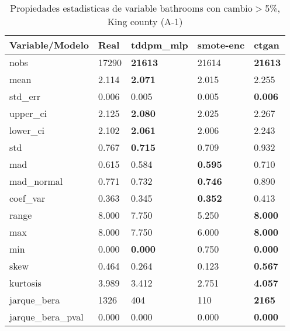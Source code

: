 \begin{table}[H]
\centering
\fontsize{8}{14}\selectfont
\caption{Propiedades estadisticas de variable bathrooms con cambio\ensuremath{>}5\%, King county (A-1)}
\label{table-stats-king county-a-1-bathrooms-short}
\begin{tabular}{|l|m{10em}|m{10em}|m{10em}|m{10em}|}
\hline
 \rowcolor[gray]{0.8}
Variable/Modelo & Real & tddpm\_mlp & smote-enc & ctgan \\
\hline nobs & 17290 & \bfseries 21613 & \cellcolor[rgb]{0.9, 0.54, 0.52} 21614 & \bfseries 21613 \\
\hline mean & 2.114 & \bfseries 2.071 & 2.015 & \cellcolor[rgb]{0.9, 0.54, 0.52} 2.255 \\
\hline std\_err & 0.006 & 0.005 & \cellcolor[rgb]{0.9, 0.54, 0.52} 0.005 & \bfseries 0.006 \\
\hline upper\_ci & 2.125 & \bfseries 2.080 & 2.025 & \cellcolor[rgb]{0.9, 0.54, 0.52} 2.267 \\
\hline lower\_ci & 2.102 & \bfseries 2.061 & 2.006 & \cellcolor[rgb]{0.9, 0.54, 0.52} 2.243 \\
\hline std & 0.767 & \bfseries 0.715 & 0.709 & \cellcolor[rgb]{0.9, 0.54, 0.52} 0.932 \\
\hline mad & 0.615 & 0.584 & \bfseries 0.595 & \cellcolor[rgb]{0.9, 0.54, 0.52} 0.710 \\
\hline mad\_normal & 0.771 & 0.732 & \bfseries 0.746 & \cellcolor[rgb]{0.9, 0.54, 0.52} 0.890 \\
\hline coef\_var & 0.363 & 0.345 & \bfseries 0.352 & \cellcolor[rgb]{0.9, 0.54, 0.52} 0.413 \\
\hline range & 8.000 & 7.750 & \cellcolor[rgb]{0.9, 0.54, 0.52} 5.250 & \bfseries 8.000 \\
\hline max & 8.000 & 7.750 & \cellcolor[rgb]{0.9, 0.54, 0.52} 6.000 & \bfseries 8.000 \\
\hline min & 0.000 & \bfseries 0.000 & \cellcolor[rgb]{0.9, 0.54, 0.52} 0.750 & \bfseries 0.000 \\
\hline skew & 0.464 & 0.264 & \cellcolor[rgb]{0.9, 0.54, 0.52} 0.123 & \bfseries 0.567 \\
\hline kurtosis & 3.989 & 3.412 & \cellcolor[rgb]{0.9, 0.54, 0.52} 2.751 & \bfseries 4.057 \\
\hline jarque\_bera & 1326 & 404 & \cellcolor[rgb]{0.9, 0.54, 0.52} 110 & \bfseries 2165 \\
\hline jarque\_bera\_pval & 0.000 & 0.000 & \cellcolor[rgb]{0.9, 0.54, 0.52} 0.000 & \bfseries 0.000 \\

\end{tabular}
\end{table}
